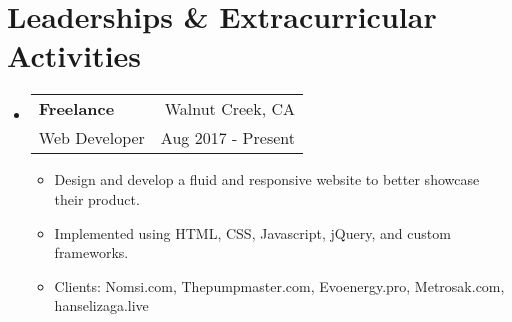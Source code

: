 \documentclass[letterpaper,11pt]{article}
\makeatletter
\newcommand{\resumeSubheading}[4]{
	\vspace{-1pt}\item
	\begin{tabular*}{0.97\textwidth}{l@{\extracolsep{\fill}}r}
		\textbf{#1} & #2 \\
		\small#3 & \small #4 \\
	\end{tabular*}\vspace{-5pt}
}
\newcommand{\resumeSubHeadingListStart}{\begin{itemize}[leftmargin=*]}
\newcommand{\resumeSubHeadingListEnd}{\end{itemize}}
\makeatother
\begin{document}
	\section{Leaderships \& Extracurricular Activities}
	\resumeSubHeadingListStart
	\resumeSubheading
	{Freelance}{Walnut Creek, CA}
	{Web Developer}{Aug 2017 - Present}
	\begin{itemize}
		\item {Design and develop a fluid and responsive website to better showcase their product.}  
		\item {Implemented using HTML, CSS, Javascript, jQuery, and custom frameworks.}  
		\item {Clients: Nomsi.com, Thepumpmaster.com, Evoenergy.pro, Metrosak.com, hanselizaga.live}  
	\end{itemize}
	\resumeSubHeadingListEnd
	
	
	
	
\end{document}
